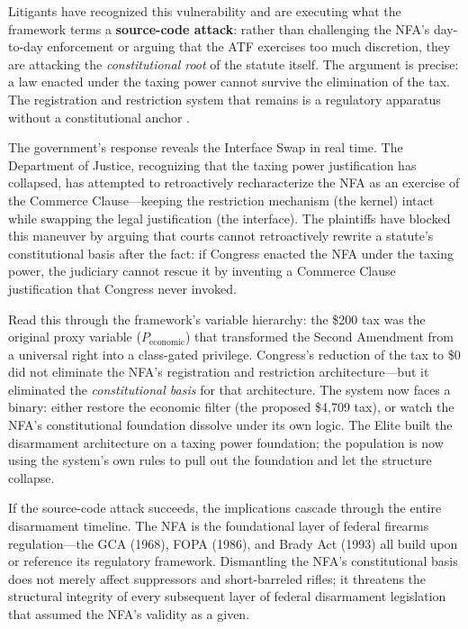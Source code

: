 \documentclass[12pt,openany]{book}
\begin{document}
Litigants have recognized this vulnerability and are executing what the framework terms a \textbf{source-code attack}: rather than challenging the NFA's day-to-day enforcement or arguing that the ATF exercises too much discretion, they are attacking the \textit{constitutional root} of the statute itself. The argument is precise: a law enacted under the taxing power cannot survive the elimination of the tax. The registration and restriction system that remains is a regulatory apparatus without a constitutional anchor \cite{nfataxzero}.

The government's response reveals the Interface Swap in real time. The Department of Justice, recognizing that the taxing power justification has collapsed, has attempted to retroactively recharacterize the NFA as an exercise of the Commerce Clause---keeping the restriction mechanism (the kernel) intact while swapping the legal justification (the interface). The plaintiffs have blocked this maneuver by arguing that courts cannot retroactively rewrite a statute's constitutional basis after the fact: if Congress enacted the NFA under the taxing power, the judiciary cannot rescue it by inventing a Commerce Clause justification that Congress never invoked.

Read this through the framework's variable hierarchy: the \$200 tax was the original proxy variable ($P_{\text{economic}}$) that transformed the Second Amendment from a universal right into a class-gated privilege. Congress's reduction of the tax to \$0 did not eliminate the NFA's registration and restriction architecture---but it eliminated the \textit{constitutional basis} for that architecture. The system now faces a binary: either restore the economic filter (the proposed \$4,709 tax), or watch the NFA's constitutional foundation dissolve under its own logic. The Elite built the disarmament architecture on a taxing power foundation; the population is now using the system's own rules to pull out the foundation and let the structure collapse.

If the source-code attack succeeds, the implications cascade through the entire disarmament timeline. The NFA is the foundational layer of federal firearms regulation---the GCA (1968), FOPA (1986), and Brady Act (1993) all build upon or reference its regulatory framework. Dismantling the NFA's constitutional basis does not merely affect suppressors and short-barreled rifles; it threatens the structural integrity of every subsequent layer of federal disarmament legislation that assumed the NFA's validity as a given.
\end{document}
